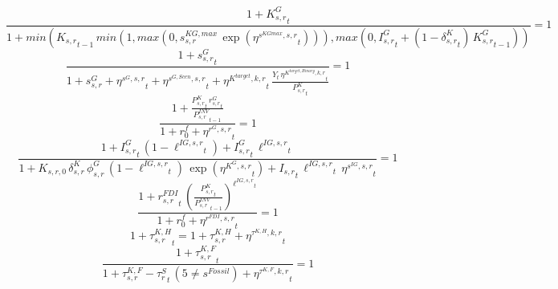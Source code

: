 \noindent[name= `sector specific public capital 4 1']
\begin{dmath}
\frac{1+{{K^G_{s,r}}}_{t}}{1+min({{K_{s,r}}}_{t-1}\, min(1,max(0,{{s^{KG,max}_{s,r}}}\, \exp\left({{\eta^{s^{KGmax},s,r}}}_{t}\right))),max(0,{{I^G_{s,r}}}_{t}+\left(1-{{\delta^{K}_{s,r}}}_{t}\right)\, {{K^G_{s,r}}}_{t-1}))}=1
\end{dmath}
\noindent[name= `sector specific public investment 4 1']
\begin{dmath}
\frac{1+{{s^G_{s,r}}}_{t}}{1+{{s^{G}_{s,r}}}+{{\eta^{s^G,s,r}}}_{t}+{{\eta^{s^{G,Scen},s,r}}}_{t}+{{\eta^{K^{target},k,r}}}_{t}\, \frac{{Y}_{t}\, {{\eta^{K^{target,Binary},k,r}}}_{t}}{{{P^K_{s,r}}}_{t}}}=1
\end{dmath}
\noindent[name= `sector specific public rental rate 4 1']
\begin{dmath}
\frac{1+\frac{{{P^K_{s,r}}}_{t}\, {{r^G_{s,r}}}_{t}}{{{P^{INV}_{s,r}}}_{t-1}}}{1+{{r^f_0}}+{{\eta^{r^G,s,r}}}_{t}}=1
\end{dmath}
\noindent[name= `scenario sector specific public capital / investment share 4 1']
\begin{dmath}
\frac{1+{{I^G_{s,r}}}_{t}\, \left(1-{{\ell^{IG,s,r}}}_{t}\right)+{{I^G_{s,r}}}_{t}\, {{\ell^{IG,s,r}}}_{t}}{1+{{K_{s,r,0}}}\, {{\delta^{K}_{s,r}}}\, {{\phi^{G}_{s,r}}}\, \left(1-{{\ell^{IG,s,r}}}_{t}\right)\, \exp\left({{\eta^{K^G,s,r}}}_{t}\right)+{{I_{s,r}}}_{t}\, {{\ell^{IG,s,r}}}_{t}\, {{\eta^{s^{IG},s,r}}}_{t}}=1
\end{dmath}
\noindent[name= `FDI rental rate (returns to foreign investors) 4 1']
\begin{dmath}
\frac{1+{{r^{FDI}_{s,r}}}_{t}\, \left(\frac{{{P^K_{s,r}}}_{t}}{{{P^{INV}_{s,r}}}_{t-1}}\right)^{{{\ell^{IG,s,r}}}_{t}}}{1+{{r^f_0}}+{{\eta^{r^{FDI},s,r}}}_{t}}=1
\end{dmath}
\noindent[name= `taxes on household capital income 5 1']
\begin{dmath}
1+{{\tau^{K,H}_{s,r}}}_{t}=1+{{\tau^{K,H}_{s,r}}}+{{\eta^{\tau^{K,H},k,r}}}_{t}
\end{dmath}
\noindent[name= `sector specific corporate tax rate paid by firms 5 1']
\begin{dmath}
\frac{1+{{\tau^{K,F}_{s,r}}}_{t}}{1+{{\tau^{K,F}_{s,r}}}-{{\tau^{S}_{r}}}_{t}\, \left(5\neq {{s^{Fossil}}}\right)+{{\eta^{\tau^{K,F},k,r}}}_{t}}=1
\end{dmath}
\noindent[name= `sector specific labour tax rate paid by firms 5 1']
